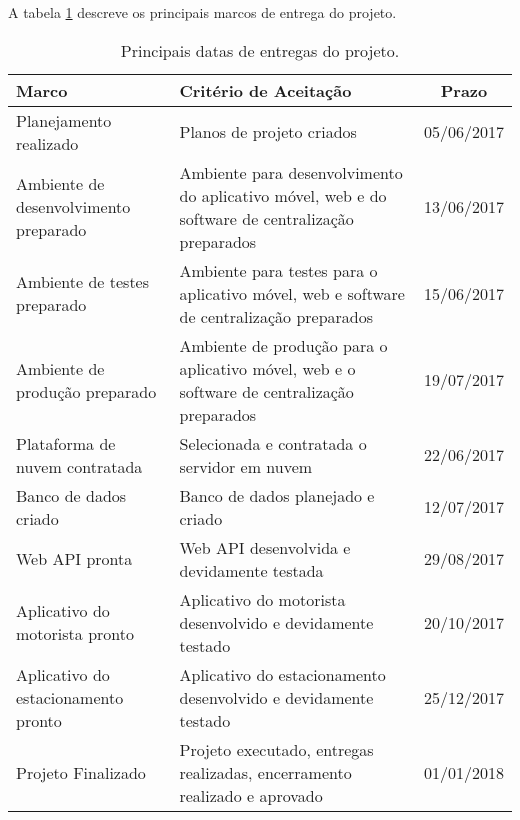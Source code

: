 A tabela \ref{tab:entregas} descreve os principais marcos de entrega do projeto.

\begin{table}[h]
	\begin{tabularx}{.9\textwidth}{| X | X | c |}
		\hline
		\textbf{Marco}                        & \textbf{Critério de Aceitação}                                                                   & \textbf{Prazo} \\
		\hline
		Planejamento realizado                & Planos de projeto criados                                                                           & 05/06/2017     \\
		\hline
		Ambiente de desenvolvimento preparado & Ambiente para desenvolvimento do aplicativo móvel, web e do software de centralização preparados & 13/06/2017     \\
		\hline
		Ambiente de testes preparado          & Ambiente para testes para o aplicativo móvel, web e software de centralização preparados         & 15/06/2017     \\
		\hline
		Ambiente de produção preparado      & Ambiente de produção para o aplicativo móvel, web e o software de centralização preparados     & 19/07/2017     \\
		\hline
		Plataforma de nuvem contratada        & Selecionada e contratada o servidor em nuvem                                                        & 22/06/2017     \\
		\hline
		Banco de dados criado                 & Banco de dados planejado e criado                                                                   & 12/07/2017     \\
		\hline
		Web API pronta                        & Web API desenvolvida e devidamente testada                                                          & 29/08/2017     \\
		\hline
		Aplicativo do motorista pronto        & Aplicativo do motorista desenvolvido e devidamente testado                                          & 20/10/2017     \\
		\hline
		Aplicativo do estacionamento pronto   & Aplicativo do estacionamento desenvolvido e devidamente testado                                     & 25/12/2017     \\
		\hline
		Projeto Finalizado                    & Projeto executado, entregas realizadas, encerramento realizado e aprovado                           & 01/01/2018     \\
		\hline
	\end{tabularx}
	\centering
	\caption{Principais datas de entregas do projeto.}
	\label{tab:entregas}
\end{table}

